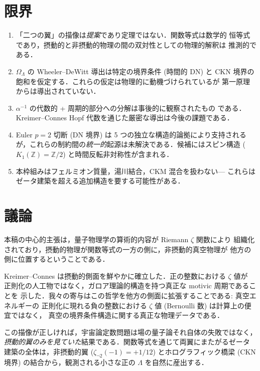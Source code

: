 \documentclass[11pt,a4paper]{article}
\begin{document}
\section{限界}

\begin{enumerate}
\item 「二つの翼」の描像は\emph{提案}であり定理ではない．関数等式は数学的
恒等式であり，摂動的と非摂動的物理の間の双対性としての物理的解釈は
推測的である．

\item $\Omega_\Lambda$ の Wheeler--DeWitt 導出は特定の境界条件 (時間的 DN)
と CKN 境界の飽和を仮定する．これらの仮定は物理的に動機づけられているが
第一原理からは導出されていない．

\item $\alpha^{-1}$ の代数的 + 周期的部分への分解は事後的に観察されたもの
である．Kreimer--Connes Hopf 代数を通じた厳密な導出は今後の課題である．

\item Euler $p = 2$ 切断 (DN 境界) は 5 つの独立な構造的論拠により支持される
が，これらの制約間の\emph{統一的}起源は未解決である．候補にはスピン構造
($K_1(\mathbb{Z}) = \mathbb{Z}/2$) と時間反転非対称性が含まれる．

\item 本枠組みはフェルミオン質量，湯川結合，CKM 混合を扱わない---
これらはゼータ建築を超える追加構造を要する可能性がある．
\end{enumerate}

\section{議論}

本稿の中心的主張は，量子物理学の算術的内容が Riemann $\zeta$ 関数により
組織化されており，摂動的物理が関数等式の一方の側に，非摂動的真空物理が
他方の側に位置するということである．

Kreimer--Connes は摂動的側面を鮮やかに確立した．正の整数における $\zeta$ 値が
正則化の人工物ではなく，ガロア理論的構造を持つ真正な motivic 周期であることを
示した．我々の寄与はこの哲学を他方の側面に拡張することである: 真空エネルギーの
正則化に現れる負の整数における $\zeta$ 値 (Bernoulli 数) は計算上の便宜ではなく，
真空の境界条件構造に関する真正な物理データである．

この描像が正しければ，宇宙論定数問題は場の量子論それ自体の失敗ではなく，
\emph{摂動的翼のみを見ていた}結果である．関数等式を通じて両翼にまたがるゼータ
建築の全体は，非摂動的翼 ($\zeta_{\neg 2}(-1) = +1/12$) とホログラフィック橋梁
(CKN 境界) の結合から，観測される小さな正の $\Lambda$ を自然に産出する．
\end{document}
